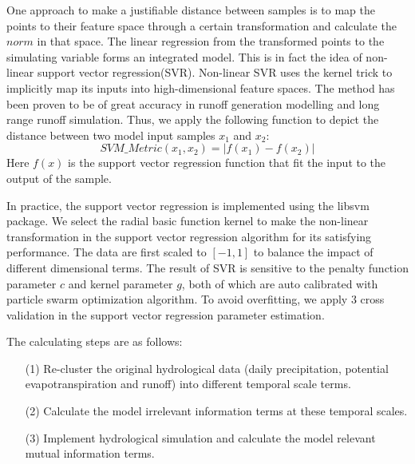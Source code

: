 \documentclass[draft,wrr]{AGUTeX}
\begin{document}
\begin{article}
 
One approach to make a justifiable distance between samples   is to map the points to their feature space through a certain transformation and calculate the $norm$ in that space. The linear regression from the transformed points to the simulating variable forms an integrated model. This is in fact the idea of non-linear support vector regression(SVR). Non-linear SVR uses the kernel trick to implicitly map its inputs into high-dimensional feature spaces. The method has been proven to be of great accuracy in runoff generation modelling\citep{dibike2001model,asefa2006multi,behzad2009generalization,phdgong} and long range runoff simulation\citep{lin2006using}. Thus, we apply the following function to depict the distance between two model input samples $x_1$ and $x_2$:
\begin{equation}\label{svm}
SVM\_Metric(x_1,x_2)=|f(x_1)-f(x_2)|
\end{equation}
Here $f(x)$ is the support vector regression function that fit the input to the output of the sample.   

In practice, the support vector regression is implemented using the libsvm package\citep{chang2011libsvm}.  We select the radial basic function kernel to make the non-linear transformation in the support vector regression algorithm for its satisfying performance. The data are first scaled to $[-1,1]$ to balance the impact of different dimensional terms. The result of SVR is sensitive to the penalty function parameter $c$ and kernel parameter $g$, both of which are auto calibrated with particle swarm optimization algorithm\citep{shi1998modified}. To avoid overfitting, we apply  3 cross validation in the support vector regression parameter estimation. 

The calculating steps are as follows:
 \begin{enumerate}
 \item [(1)]Re-cluster the original hydrological data (daily precipitation, potential evapotranspiration and runoff) into different temporal scale terms. 
 \item [(2)]Calculate the  model irrelevant information terms  at these temporal scales.
 \item [(3)]Implement hydrological simulation and calculate the model relevant mutual information terms.
 \end{enumerate}


\end{article}
\end{document}
